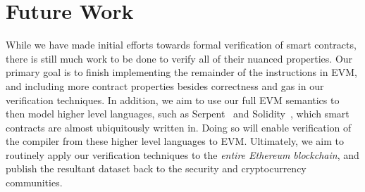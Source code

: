 \section{Future Work}
While we have made initial efforts towards formal verification of smart
contracts, there is still much work to be done to verify all of their nuanced
properties. Our primary goal is to finish implementing the remainder of the
instructions in EVM, and including more contract properties besides correctness
and gas in our verification techniques. In addition, we aim to use our full EVM
semantics to then model higher level languages, such as Serpent~\cite{serpent}
and Solidity~\cite{solidity}, which smart contracts are almost ubiquitously
written in. Doing so will enable verification of the compiler from these higher
level languages to EVM. Ultimately, we aim to routinely apply our
verification techniques to the \textit{entire Ethereum blockchain}, and
publish the resultant dataset back to the security and cryptocurrency
communities.
